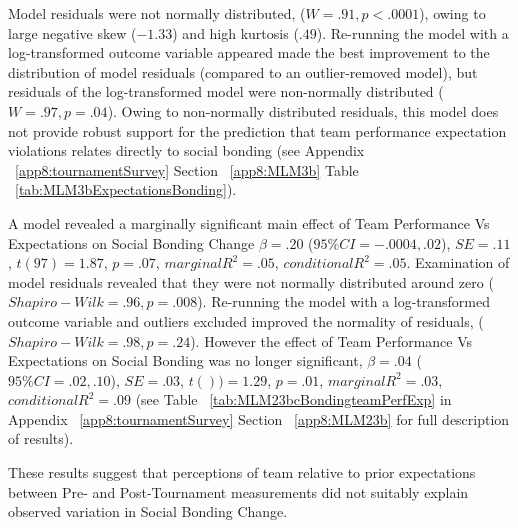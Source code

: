 \begin{CJK}{UTF8}{gbsn}
Model residuals were not normally distributed, ($W = .91, p < .0001$), owing to large negative skew ($-1.33$) and high kurtosis ($.49$). Re-running the model with a log-transformed outcome variable appeared made the best improvement to the distribution of model residuals (compared to an outlier-removed model), but residuals of the log-transformed model were non-normally distributed ($W = .97, p = .04$).  Owing to non-normally distributed residuals, this model does not provide robust support for the prediction that team performance expectation violations relates directly to social bonding (see Appendix ~\ref{app8:tournamentSurvey} Section ~\ref{app8:MLM3b} Table ~\ref{tab:MLM3bExpectationsBonding}).







  A model revealed a marginally significant main effect of Team Performance Vs Expectations on Social Bonding Change $\beta = .20$ ($95\% CI =  -.0004, .02$), $SE = .11$, $t(97) = 1.87$, $p = .07$, $marginal R^2 = .05$, $conditional R^2 = .05$.  Examination of model residuals revealed that they were not normally distributed around zero ($Shapiro-Wilk = .96, p = .008$).  Re-running the model with a log-transformed outcome variable and outliers excluded improved the normality of residuals, ($Shapiro-Wilk = .98, p = .24$).
  However the effect of Team Performance Vs Expectations on Social Bonding was no longer significant, $\beta = .04$ ($95\% CI =  .02, .10$), $SE = .03$, $t()) = 1.29$, $p = .01$, $marginal R^2 = .03$, $conditional R^2 = .09$ (see Table ~\ref{tab:MLM23bcBondingteamPerfExp} in Appendix ~\ref{app8:tournamentSurvey} Section ~\ref{app8:MLM23b} for full description of results).

  These results suggest that perceptions of team relative to prior expectations between Pre- and Post-Tournament measurements did not suitably explain observed variation in Social Bonding Change.






\end{CJK}
